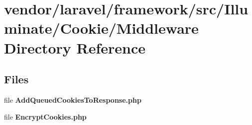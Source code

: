 \section{vendor/laravel/framework/src/\+Illuminate/\+Cookie/\+Middleware Directory Reference}
\label{dir_aff1e82fc6371f292f4912a734d87183}
\subsection*{Files}
\begin{DoxyCompactItemize}
\item 
file {\bf Add\+Queued\+Cookies\+To\+Response.\+php}
\item 
file {\bf Encrypt\+Cookies.\+php}
\end{DoxyCompactItemize}

